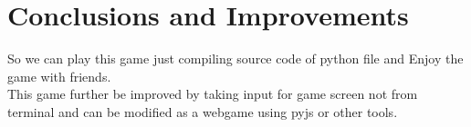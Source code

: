 \documentclass[]{article}
\begin{document}
\section{Conclusions and Improvements}

So we can play this game just compiling source code of python file and Enjoy the game with friends.\\
This game further be improved by taking input for game screen not from terminal and can be modified as 
a webgame using pyjs or other tools.
\end{document}
